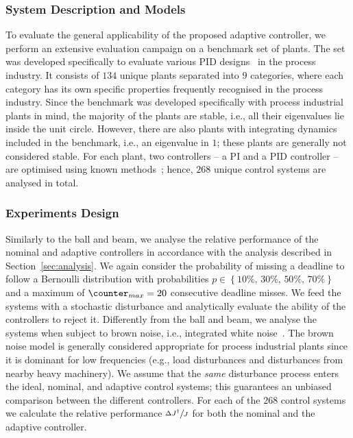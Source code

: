 \subsubsection*{System Description and Models}
To evaluate the general applicability of the proposed adaptive controller, we perform an extensive evaluation campaign on a benchmark set of plants.
The set was developed specifically to evaluate various PID designs~\cite{Astrom:2004} in the process industry.
It consists of $134$ unique plants separated into $9$ categories, where each category has its own specific properties frequently recognised in the process industry.
Since the benchmark was developed specifically with process industrial plants in mind, the majority of the plants are stable, i.e., all their eigenvalues lie inside the unit circle.
However, there are also plants with integrating dynamics included in the benchmark, i.e., an eigenvalue in $1$; these plants are generally not considered stable.
For each plant, two controllers -- a PI and a PID controller -- are optimised using known methods~\cite{Garpinger:2008}; hence, $268$ unique control systems are analysed in total.

\subsubsection*{Experiments Design}
Similarly to the ball and beam, we analyse the relative performance of the nominal and adaptive controllers in accordance with the analysis described in Section~\ref{sec:analysis}.
We again consider the probability of missing a deadline to follow a Bernoulli distribution with probabilities $p \in \left\{ 10\%,\, 30\%,\, 50\%,\, 70\% \right\}$ and a maximum of $\counter_{max} = 20$ consecutive deadline misses.
We feed the systems with a stochastic disturbance and analytically evaluate the ability of the controllers to reject it.
Differently from the ball and beam, we analyse the systems when subject to brown noise, i.e., integrated white noise~\cite{Schmidt:1985}.
The brown noise model is generally considered appropriate for process industrial plants since it is dominant for low frequencies (e.g., load disturbances and disturbances from nearby heavy machinery).
We assume that the \emph{same} disturbance process enters the ideal, nominal, and adaptive control systems; this guarantees an unbiased comparison between the different controllers.
For each of the $268$ control systems we calculate the relative performance $\sfrac{\Delta J^\dagger}{J}$ for both the nominal and the adaptive controller.

